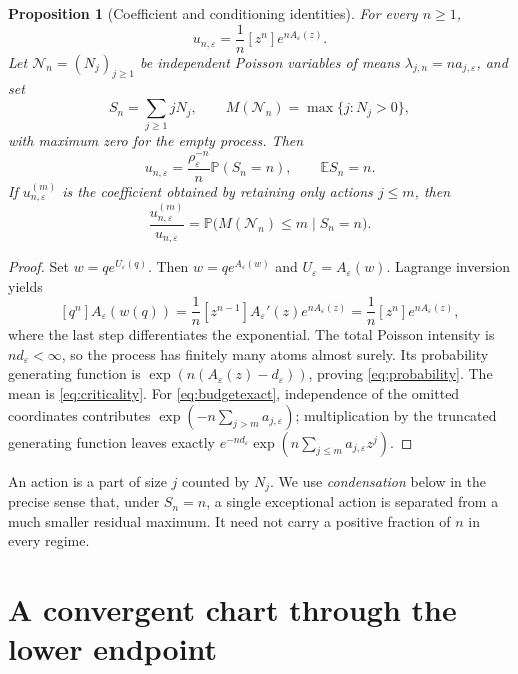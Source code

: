 \documentclass[11pt,a4paper]{article}
\newtheorem{proposition}[theorem]{Proposition}
\theoremstyle{definition}\newtheorem{definition}[theorem]{Definition}
\theoremstyle{remark}\newtheorem{remark}[theorem]{Remark}
\newcommand{\eps}{\varepsilon}
\newcommand{\Prob}{\mathbb P}
\newcommand{\E}{\mathbb E}
\newcommand{\1}{\mathbf 1}
\begin{document}
\begin{proposition}[Coefficient and conditioning identities]
\label{prop:exact}
For every $n\ge1$,
\begin{equation}\label{eq:lagrange}
 u_{n,\eps}=\frac1n[z^n]e^{nA_{\eps}(z)}.
\end{equation}
Let $\mathcal N_n=(N_j)_{j\ge1}$ be independent Poisson variables of
means $\lambda_{j,n}=n a_{j,\eps}$, and set
\begin{equation}\label{eq:S}
 S_n=\sum_{j\ge1}jN_j,\qquad
 M(\mathcal N_n)=\max\{j:N_j>0\},
\end{equation}
with maximum zero for the empty process. Then
\begin{equation}\label{eq:probability}
 u_{n,\eps}=\frac{\rho_{\eps}^{-n}}n\Prob(S_n=n),
 \qquad \E S_n=n.
\end{equation}
If $u_{n,\eps}^{(m)}$ is the coefficient obtained by retaining only
actions $j\le m$, then
\begin{equation}\label{eq:budgetexact}
 \frac{u_{n,\eps}^{(m)}}{u_{n,\eps}}
 =\Prob\bigl(M(\mathcal N_n)\le m\mid S_n=n\bigr).
\end{equation}
\end{proposition}
\begin{proof}
Set $w=qe^{U_{\eps}(q)}$. Then $w=q e^{A_{\eps}(w)}$ and
$U_{\eps}=A_{\eps}(w)$. Lagrange inversion yields
\[
 [q^n]A_{\eps}(w(q))
 =\frac1n[z^{n-1}]A_{\eps}'(z)e^{nA_{\eps}(z)}
 =\frac1n[z^n]e^{nA_{\eps}(z)},
\]
where the last step differentiates the exponential. The total Poisson
intensity is $n d_{\eps}<\infty$, so the process has finitely many atoms
almost surely. Its probability generating function is
$\exp(n(A_{\eps}(z)-d_{\eps}))$, proving
\eqref{eq:probability}. The mean is \eqref{eq:criticality}.
For \eqref{eq:budgetexact}, independence of the omitted coordinates
contributes $\exp(-n\sum_{j>m}a_{j,\eps})$; multiplication by the
truncated generating function leaves exactly
$e^{-nd_{\eps}}\exp(n\sum_{j\le m}a_{j,\eps}z^j)$.
\end{proof}

An action is a part of size $j$ counted by $N_j$. We use
\emph{condensation} below in the precise sense that, under $S_n=n$, a
single exceptional action is separated from a much smaller residual
maximum. It need not carry a positive fraction of $n$ in every regime.

\section{A convergent chart through the lower endpoint}
\label{sec:chart}
\end{document}

